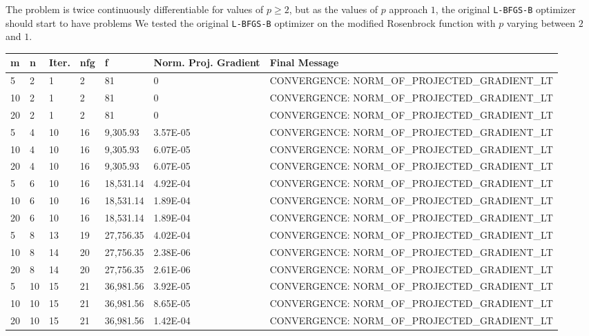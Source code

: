 The problem is twice continuously differentiable for values of $p \geq 2$, but as the values of $p$ approach $1$, the original \texttt{L-BFGS-B} optimizer should start to have problems We tested the original \texttt{L-BFGS-B} optimizer on the modified Rosenbrock function with $p$ varying between $2$ and $1$. 

\begin{center}
  \begin{table}
    \scriptsize
    \begin{tabular}{|l|l|l|l|l|p{1.2cm}|p{8.1cm}|}
      \hline
      m & n & Iter. & nfg & f & Norm. Proj. Gradient & Final Message \\ \hline
      5 & 2 & 1 & 2 & 81 & 0 & CONVERGENCE: NORM\_OF\_PROJECTED\_GRADIENT\_LT \\
      10 & 2 & 1 & 2 & 81 & 0 & CONVERGENCE: NORM\_OF\_PROJECTED\_GRADIENT\_LT \\
      20 & 2 & 1 & 2 & 81 & 0 & CONVERGENCE: NORM\_OF\_PROJECTED\_GRADIENT\_LT \\
      5 & 4 & 10 & 16 & 9,305.93 & 3.57E-05 & CONVERGENCE: NORM\_OF\_PROJECTED\_GRADIENT\_LT \\
      10 & 4 & 10 & 16 & 9,305.93 & 6.07E-05 & CONVERGENCE: NORM\_OF\_PROJECTED\_GRADIENT\_LT \\
      20 & 4 & 10 & 16 & 9,305.93 & 6.07E-05 & CONVERGENCE: NORM\_OF\_PROJECTED\_GRADIENT\_LT \\
      5 & 6 & 10 & 16 & 18,531.14 & 4.92E-04 & CONVERGENCE: NORM\_OF\_PROJECTED\_GRADIENT\_LT \\
      10 & 6 & 10 & 16 & 18,531.14 & 1.89E-04 & CONVERGENCE: NORM\_OF\_PROJECTED\_GRADIENT\_LT \\
      20 & 6 & 10 & 16 & 18,531.14 & 1.89E-04 & CONVERGENCE: NORM\_OF\_PROJECTED\_GRADIENT\_LT \\
      5 & 8 & 13 & 19 & 27,756.35& 4.02E-04 & CONVERGENCE: NORM\_OF\_PROJECTED\_GRADIENT\_LT \\
      10 & 8 & 14 & 20 & 27,756.35 & 2.38E-06 & CONVERGENCE: NORM\_OF\_PROJECTED\_GRADIENT\_LT \\
      20 & 8 & 14 & 20 & 27,756.35 & 2.61E-06 & CONVERGENCE: NORM\_OF\_PROJECTED\_GRADIENT\_LT \\
      5 & 10 & 15 & 21 & 36,981.56 & 3.92E-05 & CONVERGENCE: NORM\_OF\_PROJECTED\_GRADIENT\_LT \\
      10 & 10 & 15 & 21 & 36,981.56 & 8.65E-05 & CONVERGENCE: NORM\_OF\_PROJECTED\_GRADIENT\_LT \\
      20 & 10 & 15 & 21 & 36,981.56 & 1.42E-04 & CONVERGENCE: NORM\_OF\_PROJECTED\_GRADIENT\_LT \\

\end{tabular}
\end{table}
\end{center}

